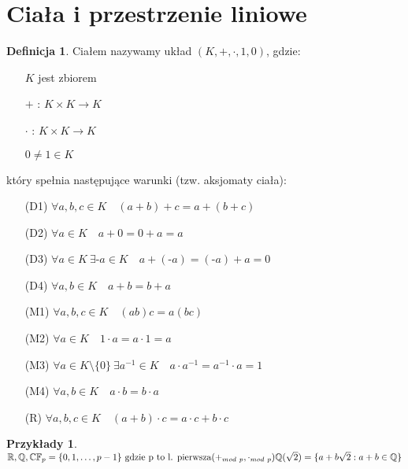 \documentclass[12pt,a4paper]{article}
\newcommand{\RR}{\mathbb{R}}
\theoremstyle{plain}
\theoremstyle{definition}
\theoremstyle{definition}
\newtheorem{df}{Definicja}[section]
\theoremstyle{definition}
\theoremstyle{definition}
\theoremstyle{definition}
\theoremstyle{definition}
\newtheorem*{przy}{Przykłady}
\theoremstyle{definition}
\theoremstyle{definition}
\begin{document}
\section{Ciała i przestrzenie liniowe}

\begin{df} 
Ciałem nazywamy układ $(K, + ,\cdot,1,0)$, gdzie:
    \begin{itemize} 
        \item[] $K$ jest zbiorem
        \item[$+$]: $K \times K \rightarrow K$
        \item[$\cdot$]: $K \times K \rightarrow K$
        \item[] $0 \neq 1 \in K$ 
    \end{itemize} 
    który spełnia następujące warunki (tzw. aksjomaty ciała):
    \begin{itemize}
        \item[(D1)] $\forall a, b, c \in K  \quad (a+b)+c = a+(b+c)$
        \item[(D2)] $\forall a \in K \quad a+0 = 0+a = a$
        \item[(D3)] $\forall a \in K \ \exists \text{-}a \in K \quad a + (\text{-}a) = (\text{-}a) + a = 0$
        \item[(D4)] $\forall a, b \in K \quad a+b = b+a$
        \item[(M1)] $\forall a, b, c \in K \quad (ab)c = a(bc) $
        \item[(M2)] $\forall a \in K \quad 1\cdot a = a\cdot 1 = a$
        \item[(M3)] $\forall a \in K \setminus \{0\} \ \exists a^{-1} \in K \quad a\cdot a^{-1} = a^{-1}\cdot a = 1$
        \item[(M4)] $\forall a, b \in K \quad a\cdot b = b\cdot a$
        \item[(R)] $ \forall a,b, c \in K \quad (a+b)\cdot c = a\cdot c + b\cdot c $
    \end{itemize}
\end{df}

\begin{przy} 
    ~\\
    $ \RR, \mathbb{Q}, \mathbb{C} \\ 
    \mathbb{F}_p = \{0, 1, \dots, p-1\} \text{ gdzie p to l. pierwsza} (+_{mod\ p}, \cdot_{mod\ p})\\ 
    \mathbb{Q}(\sqrt{2}) = \{a+b\sqrt{2} : a+b \in \mathbb{Q}\}$
\end{przy}
\end{document}
